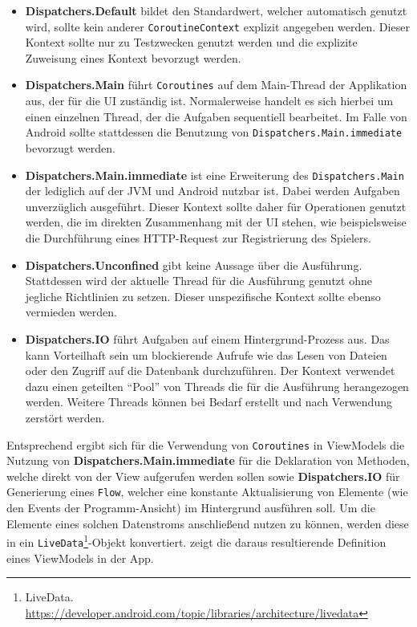 \begin{itemize}
    \item \textbf{Dispatchers.Default} bildet den Standardwert, welcher automatisch genutzt wird, sollte kein anderer \texttt{CoroutineContext} explizit angegeben werden. Dieser Kontext sollte nur zu Testzwecken genutzt werden und die explizite Zuweisung eines Kontext bevorzugt werden.
    \item \textbf{Dispatchers.Main} führt \texttt{Coroutines} auf dem Main-Thread der Applikation aus, der für die UI zuständig ist. Normalerweise handelt es sich hierbei um einen einzelnen Thread, der die Aufgaben sequentiell bearbeitet. Im Falle von Android sollte stattdessen die Benutzung von \texttt{Dispatchers.Main.immediate} bevorzugt werden.
    \item \textbf{Dispatchers.Main.immediate} ist eine Erweiterung des \texttt{Dispatchers.Main} der lediglich auf der JVM und Android nutzbar ist. Dabei werden Aufgaben unverzüglich ausgeführt. Dieser Kontext sollte daher für Operationen genutzt werden, die im direkten Zusammenhang mit der UI stehen, wie beispielsweise die Durchführung eines HTTP-Request zur Registrierung des Spielers. \newpage
    \item \textbf{Dispatchers.Unconfined} gibt keine Aussage über die Ausführung. Stattdessen wird der aktuelle Thread für die Ausführung genutzt ohne jegliche Richtlinien zu setzen. Dieser unspezifische Kontext sollte ebenso vermieden werden.
    \item \textbf{Dispatchers.IO} führt Aufgaben auf einem Hintergrund-Prozess aus. Das kann Vorteilhaft sein um blockierende Aufrufe wie das Lesen von Dateien oder den Zugriff auf die Datenbank durchzuführen. Der Kontext verwendet dazu einen geteilten \enquote{Pool} von Threads die für die Ausführung herangezogen werden. Weitere Threads können bei Bedarf erstellt und nach Verwendung zerstört werden. 
\end{itemize}

Entsprechend ergibt sich für die Verwendung von \texttt{Coroutines} in ViewModels die Nutzung von \textbf{Dispatchers.Main.immediate} für die Deklaration von Methoden, welche direkt von der View aufgerufen werden sollen sowie \textbf{Dispatchers.IO} für Generierung eines \texttt{Flow}, welcher eine konstante Aktualisierung von Elemente (wie den Events der Programm-Ansicht) im Hintergrund ausführen soll. \newline Um die Elemente eines solchen Datenstroms anschließend nutzen zu können, werden diese in ein \texttt{LiveData}\footnote{LiveData. \url{https://developer.android.com/topic/libraries/architecture/livedata}}-Objekt konvertiert.  zeigt die daraus resultierende Definition eines ViewModels in der App.

